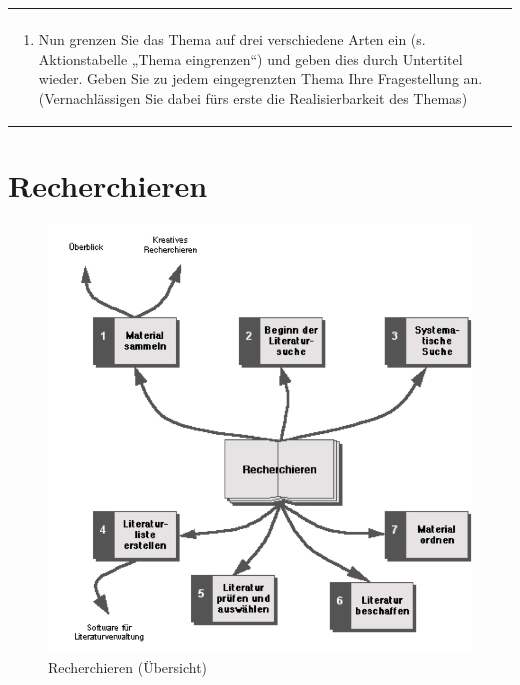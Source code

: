 \documentclass[]{book}
\providecommand{\tightlist}{%
  \setlength{\itemsep}{0pt}\setlength{\parskip}{0pt}}
\theoremstyle{definition}
\theoremstyle{definition}
\theoremstyle{definition}
\theoremstyle{remark}
\begin{document}
\begin{longtable}[]{@{}l@{}}
\begin{minipage}[t]{0.97\columnwidth}
\end{minipage}\tabularnewline
\begin{minipage}[t]{0.97\columnwidth}\raggedright\strut
\begin{enumerate}
\def\labelenumi{\arabic{enumi}.}
\setcounter{enumi}{3}
\tightlist
\item
  Nun grenzen Sie das Thema auf drei verschiedene Arten ein (s.
  Aktionstabelle „Thema eingrenzen``) und geben dies durch Untertitel
  wieder. Geben Sie zu jedem eingegrenzten Thema Ihre Fragestellung an.
  (Vernachlässigen Sie dabei fürs erste die Realisierbarkeit des Themas)
\end{enumerate}\strut
\end{minipage}\tabularnewline
\bottomrule
\end{longtable}

\chapter{Recherchieren}\label{recherchieren}

\begin{figure}

{\centering \includegraphics{images/recherchieren-min} 

}

\caption{Recherchieren (Übersicht)}\label{fig:unnamed-chunk-3}
\end{figure}
\end{document}
